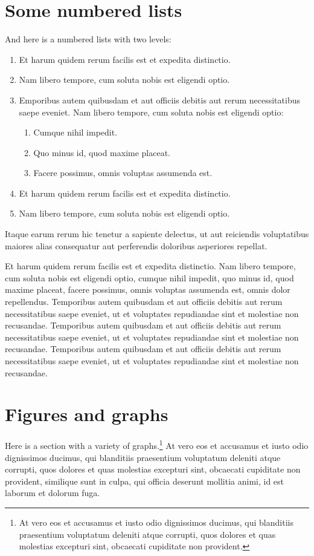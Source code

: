 \section{Some numbered lists}\label{s:numberedlists}

And here is a numbered lists with two levels:
\begin{enumerate}
\item Et harum quidem rerum facilis est et expedita distinctio.
\item Nam libero tempore, cum soluta nobis est eligendi optio.
\item Emporibus autem quibusdam et aut officiis debitis aut rerum necessitatibus saepe eveniet. Nam libero tempore, cum soluta nobis est eligendi optio:
\begin{enumerate}
	\item Cumque nihil impedit.
	\item Quo minus id, quod maxime placeat.
	\item Facere possimus, omnis voluptas assumenda est.
\end{enumerate}
\item Et harum quidem rerum facilis est et expedita distinctio.
\item Nam libero tempore, cum soluta nobis est eligendi optio.
\end{enumerate}
Itaque earum rerum hic tenetur a sapiente delectus, ut aut reiciendis voluptatibus maiores alias consequatur aut perferendis doloribus asperiores repellat. 

Et harum quidem rerum facilis est et expedita distinctio. Nam libero tempore, cum soluta nobis est eligendi optio, cumque nihil impedit, quo minus id, quod maxime placeat, facere possimus, omnis voluptas assumenda est, omnis dolor repellendus. Temporibus autem quibusdam et aut officiis debitis aut rerum necessitatibus saepe eveniet, ut et voluptates repudiandae sint et molestiae non recusandae. Temporibus autem quibusdam et aut officiis debitis aut rerum necessitatibus saepe eveniet, ut et voluptates repudiandae sint et molestiae non recusandae. Temporibus autem quibusdam et aut officiis debitis aut rerum necessitatibus saepe eveniet, ut et voluptates repudiandae sint et molestiae non recusandae.

\section{Figures and graphs}\label{s:graphs}

Here is a section with a variety of graphs.\footnote{At vero eos et accusamus et iusto odio dignissimos ducimus, qui blanditiis praesentium voluptatum deleniti atque corrupti, quos dolores et quas molestias excepturi sint, obcaecati cupiditate non provident.} At vero eos et accusamus et iusto odio dignissimos ducimus, qui blanditiis praesentium voluptatum deleniti atque corrupti, quos dolores et quas molestias excepturi sint, obcaecati cupiditate non provident, similique sunt in culpa, qui officia deserunt mollitia animi, id est laborum et dolorum fuga. 

